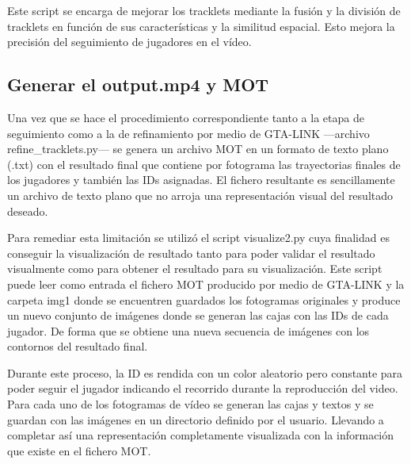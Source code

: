 \documentclass[12pt, a4paper, twoside]{article}
\begin{document}
	Este script se encarga de mejorar los tracklets mediante la fusión y la división de tracklets en función de sus características y la similitud espacial. Esto mejora la precisión del seguimiento de jugadores en el vídeo.
	
	\subsection{Generar el output.mp4 y MOT}
	
	Una vez que se hace el procedimiento correspondiente tanto a la etapa de seguimiento como a la de refinamiento por medio de GTA-LINK —archivo refine\_tracklets.py— se genera un archivo MOT en un formato de texto plano (.txt) con el resultado final que contiene por fotograma las trayectorias finales de los jugadores y también las IDs asignadas. El fichero resultante es sencillamente un archivo de texto plano que no arroja una representación visual del resultado deseado.
	
	Para remediar esta limitación se utilizó el script visualize2.py cuya finalidad es conseguir la visualización de resultado tanto para poder validar el resultado visualmente como para obtener el resultado para su visualización. Este script puede leer como entrada el fichero MOT producido por medio de GTA-LINK y la carpeta img1 donde se encuentren guardados los fotogramas originales y produce un nuevo conjunto de imágenes donde se generan las cajas con las IDs de cada jugador. De forma que se obtiene una nueva secuencia de imágenes con los contornos del resultado final.
	
	Durante este proceso, la ID es rendida con un color aleatorio pero constante para poder seguir el jugador indicando el recorrido durante la reproducción del video. Para cada uno de los fotogramas de vídeo se generan las cajas y textos y se guardan con las imágenes en un directorio definido por el usuario. Llevando a completar así una representación completamente visualizada con la información que existe en el fichero MOT.
	
\end{document}
